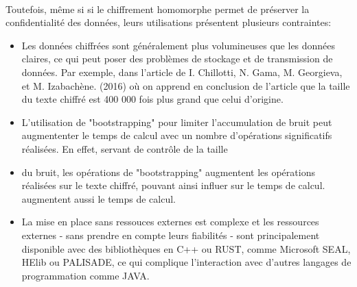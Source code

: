 \documentclass{article}
\begin{document}
$ $\\
Toutefois, même si si le chiffrement homomorphe permet de préserver la confidentialité des données, leurs utilisations présentent plusieurs contraintes:
\begin{itemize}
    \item Les données chiffrées sont généralement plus volumineuses que les données claires, ce qui peut poser des problèmes de stockage et de transmission de données. Par exemple,
          dans l'article de I. Chillotti, N. Gama, M. Georgieva, et M. Izabachène. (2016) \cite{end_size} où on apprend en conclusion de l'article que la taille du texte chiffré est 400 000 fois plus grand que celui d'origine.
    \item L'utilisation de "bootstrapping" \cite{boots} pour limiter l'accumulation de bruit peut augmententer le temps de calcul avec un nombre d'opérations significatifs réalisées. En effet, servant de contrôle de la taille
    \item du bruit, les opérations de "bootstrapping" augmentent les opérations réalisées sur le texte chiffré, pouvant ainsi influer sur le temps de calcul.
          augmentent aussi le temps de calcul.
    \item La mise en place sans ressouces externes est complexe et les ressources externes - sans prendre en compte leurs fiabilités - sont principalement disponible avec des bibliothèques
          en C++ ou RUST, comme Microsoft SEAL, HElib ou PALISADE, ce qui complique l'interaction avec d'autres langages de programmation comme JAVA.
\end{itemize}
\end{document}
